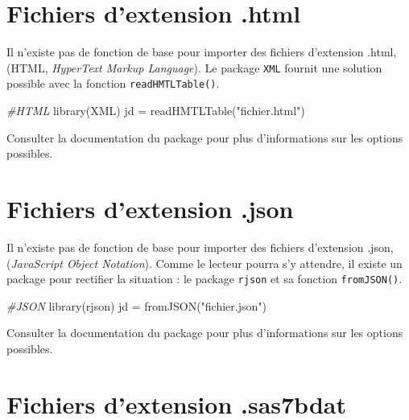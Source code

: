 \documentclass[
]{book}
\newenvironment{Shaded}{}{}
\newcommand{\CommentTok}[1]{\textit{#1}}
\newcommand{\FunctionTok}[1]{#1}
\newcommand{\NormalTok}[1]{#1}
\newcommand{\OtherTok}[1]{#1}
\newcommand{\StringTok}[1]{#1}
\begin{document}
\hypertarget{fichiers-dextension-.html}{%
\section{Fichiers d'extension .html}\label{fichiers-dextension-.html}}

Il n'existe pas de fonction de base pour importer des fichiers d'extension .html, (HTML, \emph{HyperText Markup Language}). Le package \texttt{XML} fournit une solution possible avec la fonction \texttt{readHMTLTable()}.

\begin{Shaded}
\begin{Highlighting}[]
\CommentTok{\#HTML}
\FunctionTok{library}\NormalTok{(XML)}
\NormalTok{jd }\OtherTok{=} \FunctionTok{readHMTLTable}\NormalTok{(}\StringTok{"fichier.html"}\NormalTok{)}
\end{Highlighting}
\end{Shaded}

Consulter la documentation du package pour plus d'informations sur les options possibles.

\hypertarget{fichiers-dextension-.json}{%
\section{Fichiers d'extension .json}\label{fichiers-dextension-.json}}

Il n'existe pas de fonction de base pour importer des fichiers d'extension .json, (\emph{JavaScript Object Notation}). Comme le lecteur pourra s'y attendre, il existe un package pour rectifier la situation : le package \texttt{rjson} et sa fonction \texttt{fromJSON()}.

\begin{Shaded}
\begin{Highlighting}[]
\CommentTok{\#JSON}
\FunctionTok{library}\NormalTok{(rjson)}
\NormalTok{jd }\OtherTok{=} \FunctionTok{fromJSON}\NormalTok{(}\StringTok{"fichier.json"}\NormalTok{)}
\end{Highlighting}
\end{Shaded}

Consulter la documentation du package pour plus d'informations sur les options possibles.

\hypertarget{fichiers-dextension-.sas7bdat}{%
\section{Fichiers d'extension .sas7bdat}\label{fichiers-dextension-.sas7bdat}}
\end{document}
